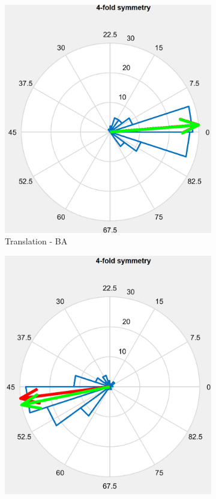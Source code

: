\documentclass[a4paper]{article}
\begin{document}
\begin{figure}[h]
    \vspace{0.5cm}
    \begin{subfigure}[b]{0.3\textwidth}
        \includegraphics[width=\linewidth]{alignment_trans_BA.png}
        \caption{Translation - BA}
        \label{fig:alignment_trans_BA}
    \end{subfigure}
    \hfill
    \begin{subfigure}[b]{0.3\textwidth}
        \includegraphics[width=\linewidth]{alignment_question_BA.png}

\end{subfigure}
\end{figure}
\end{document}
